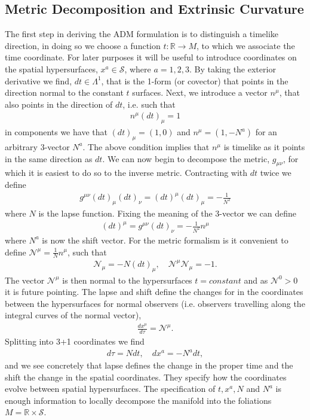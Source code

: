 \documentclass[10pt]{report}
\theoremstyle{definition}
\newcommand{\R}[0]{\mathbb{R}}
\newcommand{\N}[0]{\mathcal{N}}
\newcommand{\spasurf}[0]{\mathcal{S}}
\begin{document}
\subsection{Metric Decomposition and Extrinsic Curvature}
The first step in deriving the ADM formulation is to distinguish a timelike direction, in doing so we choose a function $t : \R \rightarrow M$, to which we associate the time coordinate. For later purposes it will be useful to introduce coordinates on the spatial hypersurfaces, $x^a \in \spasurf$, where $a = 1,2,3$. By taking the exterior derivative we find, $dt \in \Lambda^1$, that is the 1-form (or covector) that points in the direction normal to the constant $t$ surfaces. Next, we introduce a vector $n^\mu$, that also points in the direction of $dt$, i.e. such that 
\begin{align}
    n^\mu (dt)_\mu = 1
\end{align}
in components we have that $(dt)_\mu = (1,0)$ and $n^\mu = (1,-N^a)$ for an arbitrary 3-vector $N^a$. The above condition implies that $n^\mu$ is timelike as it points in the same direction as $dt$. We can now begin to decompose the metric, $g_{\mu\nu}$, for which it is easiest to do so to the inverse metric. Contracting with $dt$ twice we define 
\begin{align}
    g^{\mu\nu} (dt)_\mu (dt)_\nu = (dt)^\mu (dt)_\mu = -\frac{1}{N^2}
\end{align}
where $N$ is the lapse function. Fixing the meaning of the 3-vector we can define 
\begin{align}
    (dt)^\mu = g^{\mu\nu} (dt)_\nu = -\frac{1}{N^2} n^\mu
\end{align}
where $N^a$ is now the shift vector. For the metric formalism is it convenient to define $\N^\mu = \frac{1}{N} n^\mu$, such that 
\begin{align}
    \N_\mu = -N (dt)_\mu, \quad \N^\mu \N_\mu = -1.
\end{align}
The vector $\N^\mu$ is then normal to the hypersurfaces $t = constant$ and as $\N^0 > 0$ it is future pointing. The lapse and shift define the changes for in the coordinates between the hypersurfaces for normal observers (i.e. observers travelling along the integral curves of the normal vector), 
\begin{align}
    \frac{dx^\mu}{d\tau} = \N^\mu.
\end{align}
Splitting into 3+1 coordinates we find 
\begin{align}
    d\tau = N dt, \quad dx^a = -N^a dt,
\end{align}
and we see concretely that lapse defines the change in the proper time and the shift the change in the spatial coordinates. They specify how the coordinates evolve between spatial hypersurfaces. The specification of $t,x^a,N$ and $N^a$ is enough information to locally decompose the manifold into the foliations $M = \R \times \spasurf$.
\end{document}

